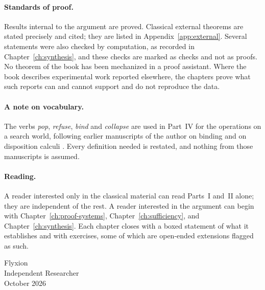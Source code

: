 \paragraph{Standards of proof.} Results internal to the argument are proved. Classical external theorems are stated precisely and cited; they are listed in Appendix~\ref{app:external}. Several statements were also checked by computation, as recorded in Chapter~\ref{ch:synthesis}, and these checks are marked as checks and not as proofs. No theorem of the book has been mechanized in a proof assistant. Where the book describes experimental work reported elsewhere, the chapters prove what such reports can and cannot support and do not reproduce the data.

\paragraph{A note on vocabulary.} The verbs \emph{pop}, \emph{refuse}, \emph{bind} and \emph{collapse} are used in Part~IV for the operations on a search world, following earlier manuscripts of the author on binding and on disposition calculi \cite{flyxion-binding,flyxion-disposition}. Every definition needed is restated, and nothing from those manuscripts is assumed.

\paragraph{Reading.} A reader interested only in the classical material can read Parts~I and~II alone; they are independent of the rest. A reader interested in the argument can begin with Chapter~\ref{ch:proof-systems}, Chapter~\ref{ch:sufficiency}, and Chapter~\ref{ch:synthesis}. Each chapter closes with a boxed statement of what it establishes and with exercises, some of which are open-ended extensions flagged as such.

\bigskip
\begin{flushright}
Flyxion\\
Independent Researcher\\
October 2026
\end{flushright}
